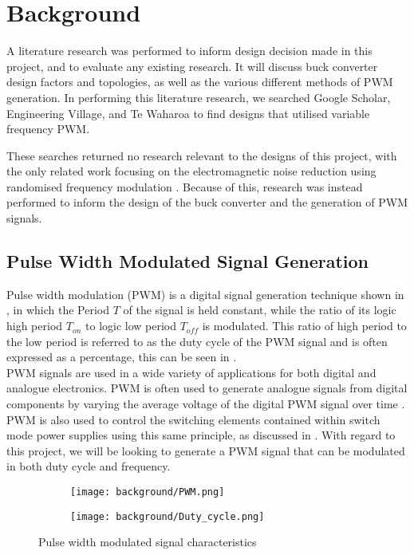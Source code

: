 \chapter{Background}\label{C:background}

A literature research was performed to inform design decision made in this project, and to evaluate any existing research. It will discuss buck converter design factors and topologies, as well as the various different methods of PWM generation. In performing this literature research, we searched Google Scholar, Engineering Village, and Te Waharoa to find designs that utilised variable frequency PWM. 

These searches returned no research relevant to the designs of this project, with the only related work focusing on the electromagnetic noise reduction using randomised frequency modulation \cite{Roman2001,Familiant2016}. Because of this, research was instead performed to inform the design of the buck converter and the generation of PWM signals.

\section{Pulse Width Modulated Signal Generation}\label{S:PWM_back}

Pulse width modulation (PWM) is a digital signal generation technique shown in , in which the Period $T$ of the signal is held constant, while the ratio of its logic high period $T_{on}$ to logic low period $T_{off}$ is modulated. This ratio of high period to the low period is referred to as the duty cycle of the PWM signal and is often expressed as a percentage, this can be seen in .\\

PWM signals are used in a wide variety of applications for both digital and analogue electronics. PWM is often used to generate analogue signals from digital components by varying the average voltage of the digital PWM signal over time \cite{Tareen2019}. PWM is also used to control the switching elements contained within switch mode power supplies using this same principle, as discussed in . With regard to this project, we will be looking to generate a PWM signal that can be modulated in both duty cycle and frequency.

\begin{figure}[H]
      \centering
      \begin{subfigure}{0.45\textwidth}
          \texttt{[image: background/PWM.png]}
          \label{F:PWM}
      \end{subfigure}
      \hspace{10pt}
      \begin{subfigure}{0.5\textwidth}
          \texttt{[image: background/Duty\_cycle.png]}
          \vspace{-6pt}
          \label{F:Duty}
      \end{subfigure}
      \caption{Pulse width modulated signal characteristics}
      \label{F:PWM_description}
  \end{figure}

